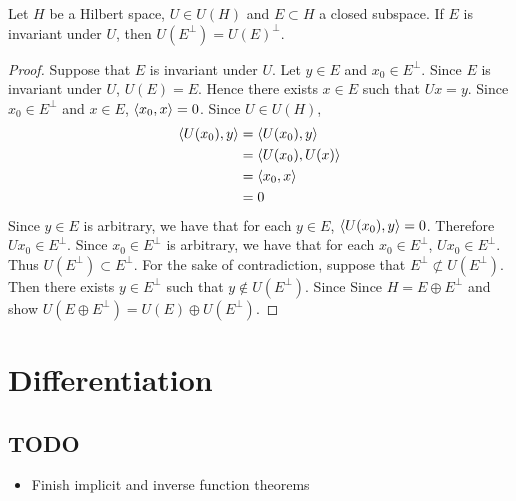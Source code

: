 \documentclass{book}
\begin{document}
	\begin{ex}
		Let $H$ be a Hilbert space, $U \in U(H)$ and $E \subset H$ a closed subspace. If $E$ is invariant under $U$, then $U(E^{\perp}) = U(E)^{\perp}$.
	\end{ex}

	\begin{proof}
		Suppose that $E$ is invariant under $U$. Let $y \in E$ and $x_0 \in E^{\perp}$. Since $E$ is invariant under $U$, $U(E) = E$. Hence there exists $x \in E$ such that $Ux = y$. Since $x_0 \in E^{\perp}$ and $x \in E$, $\langle x_0, x \rangle = 0$. Since $U \in U(H)$, 
		\begin{align*}
			\langle U(x_0), y\rangle
			& = \langle U(x_0), y \rangle \\
			& = \langle U(x_0), U(x) \rangle \\
			& =  \langle x_0, x \rangle \\
			& = 0
		\end{align*}  
		Since $y \in E$ is arbitrary, we have that for each $y \in E$, $\langle U(x_0), y\rangle = 0$. Therefore $U x_0 \in E^{\perp}$. Since $x_0 \in E^{\perp}$ is arbitrary, we have that for each $x_0 \in E^{\perp}$, $U x_0 \in E^{\perp}$. Thus $U(E^{\perp}) \subset E^{\perp}$. For the sake of contradiction, suppose that $E^{\perp} \not \subset U(E^{\perp})$. Then there exists $y \in E^{\perp}$ such that $y \not \in U(E^{\perp})$. Since Since $H = E \oplus E^{\perp}$ and  show $U(E \oplus E^{\perp}) = U(E) \oplus U(E^{\perp})$.
	\end{proof}
	
	
	
	
	
	
	
	
	
	
	
	
	
	
	
	
	
	
	
	\newpage
	\chapter{Differentiation}
	
	\newpage
	
	\section{TODO}
	\begin{itemize}
		\item Finish implicit and inverse function theorems
	\end{itemize}
	
\end{document}
